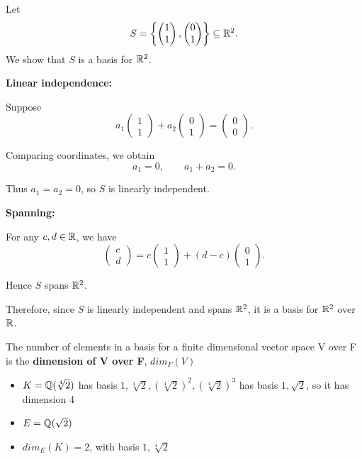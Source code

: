 \documentclass[main.tex]{subfiles}
\begin{document}
\begin{example}
    Let
    \[
    S = \left\{
    \begin{pmatrix}
        1 \\ 1
    \end{pmatrix},
    \begin{pmatrix}
        0 \\ 1
    \end{pmatrix}
    \right\} \subseteq \mathbb{R}^2.
    \]
    We show that $S$ is a basis for $\mathbb{R}^2$.

    \textbf{Linear independence:}

    Suppose
    \[
    a_1 \begin{pmatrix}
        1 \\ 1
    \end{pmatrix}
    + a_2 \begin{pmatrix}
        0 \\ 1
    \end{pmatrix}
    = \begin{pmatrix}
        0 \\ 0
    \end{pmatrix}.
    \]

    Comparing coordinates, we obtain
    \[
    a_1 = 0, \qquad a_1 + a_2 = 0.
    \]

    Thus $a_1 = a_2 = 0$, so $S$ is linearly independent.

    \textbf{Spanning:}

    For any $c,d \in \mathbb{R}$, we have
    \[
    \begin{pmatrix}
        c \\ d
    \end{pmatrix}
    = c \begin{pmatrix}
        1 \\ 1
    \end{pmatrix}
    + (d-c) \begin{pmatrix}
        0 \\ 1
    \end{pmatrix}.
    \]

    Hence $S$ spans $\mathbb{R}^2$.

    Therefore, since $S$ is linearly independent and spans $\mathbb{R}^2$,
    it is a basis for $\mathbb{R}^2$ over $\mathbb{R}$.
\end{example}

\begin{definition}
    The number of elements in a basis for a finite dimensional vector space V over F is the \textbf{dimension of V over F}, $dim_F(V)$
\end{definition}
\begin{example}\leavevmode
    \begin{itemize}
        \item $K = \mathbb{Q}(\sqrt[4]{2})$ has basis ${1, \sqrt[4]{2}, (\sqrt[4]{2})^2, (\sqrt[4]{2})^3}$ has basis ${1, \sqrt{2}}$, so it has dimension 4
        \item $E = \mathbb{Q}(\sqrt{2})$
        \item $dim_E(K) = 2$, with basis ${1, \sqrt[4]{2}}$
    \end{itemize}
\end{example}
\end{document}
